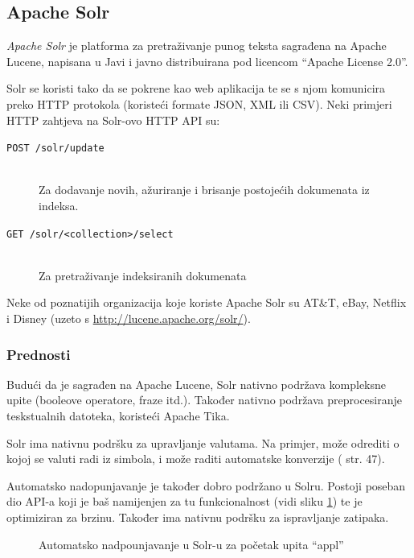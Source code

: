 \documentclass[a4paper,twoside,12pt]{scrreprt}
\begin{document}
\subsection{Apache Solr}

\textit{Apache Solr} je platforma za pretraživanje punog teksta sagrađena na Apache Lucene, napisana u Javi i javno distribuirana pod licencom ``Apache License 2.0''.

Solr se koristi tako da se pokrene kao web aplikacija te se s njom komunicira preko HTTP protokola (koristeći formate JSON, XML ili CSV). Neki primjeri HTTP zahtjeva na Solr-ovo HTTP API su:

\begin{description}
  \item[\texttt{POST /solr/update}] \hfill \\ Za dodavanje novih, ažuriranje i brisanje postojećih dokumenata iz indeksa.
  \item[\texttt{GET /solr/<collection>/select}] \hfill \\ Za pretraživanje indeksiranih dokumenata
\end{description}

Neke od poznatijih organizacija koje koriste Apache Solr su AT\&T, eBay, Netflix i Disney (uzeto s \url{http://lucene.apache.org/solr/}).

\subsubsection{Prednosti}

Budući da je sagrađen na Apache Lucene, Solr nativno podržava kompleksne upite (booleove operatore, fraze itd.). Također nativno podržava preprocesiranje teskstualnih datoteka, koristeći Apache Tika.

Solr ima nativnu podršku za upravljanje valutama. Na primjer, može odrediti o kojoj se valuti radi iz simbola, i može raditi automatske konverzije (\cite{solr} str. 47).

Automatsko nadopunjavanje je također dobro podržano u Solru. Postoji poseban dio API-a koji je baš namijenjen za tu funkcionalnost (vidi sliku \ref{solr-typeahead}) te je optimiziran za brzinu. Također ima nativnu podršku za ispravljanje zatipaka.

\begin{figure}[H]
  \centering
  \caption{Automatsko nadpounjavanje u Solr-u za početak upita ``appl''}
  \label{solr-typeahead}
\end{figure}
\end{document}
